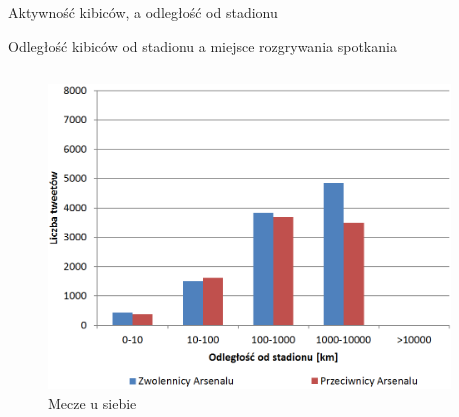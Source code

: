 \documentclass[xcolor=table]{beamer}
\begin{document}

\begin{frame}{Aktywność kibiców, a odległość od stadionu}

Odległość kibiców od stadionu a miejsce rozgrywania spotkania

\begin{columns}[C] %
\begin{column}{.48\textwidth}

\begin{figure}[ht!]
\centering
\includegraphics[width=\linewidth]{img/odleglosc-od-stadionu-home.png}
\caption{Mecze u siebie}
\end{figure}

\end{column}%
\hfill%
\begin{column}{.48\textwidth}



\end{column}
\end{columns}
\end{frame}
\end{document}
